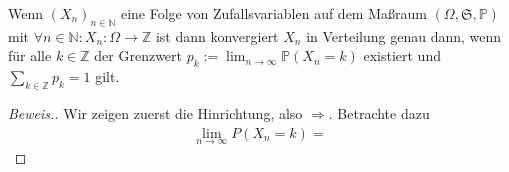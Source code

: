 \begin{lemma}
    Wenn $(X_n)_{n\in\mathbb{N}}$ eine Folge von Zufallsvariablen auf dem Maßraum $(\Omega,\mathfrak{S},\mathbb{P})$ mit $\forall n\in\mathbb{N}:X_n:\Omega\to\mathbb{Z}$ ist dann konvergiert $X_n$ in Verteilung genau dann, wenn für alle $k\in\mathbb{Z}$ der Grenzwert $p_k:=\lim_{n\to\infty}\mathbb{P}(X_n=k)$ existiert und $\sum_{k\in\mathbb{Z}}p_k=1$ gilt.
\end{lemma}
\begin{proof}[Beweis.]
    Wir zeigen zuerst die Hinrichtung, also $\Rightarrow$. Betrachte dazu
    \begin{align*}
        \lim_{n\to\infty} P(X_n = k) =
    \end{align*}
\end{proof}